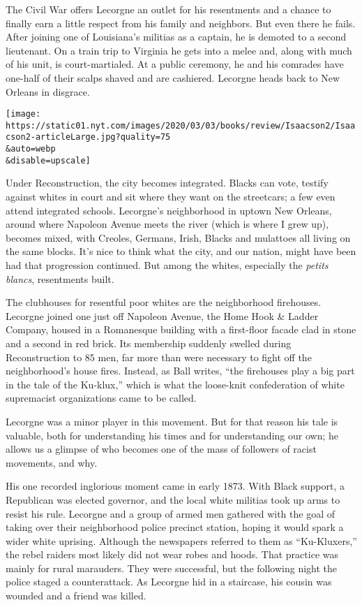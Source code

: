 The Civil War offers Lecorgne an outlet for his resentments and a chance
to finally earn a little respect from his family and neighbors. But even
there he fails. After joining one of Louisiana's militias as a captain,
he is demoted to a second lieutenant. On a train trip to Virginia he
gets into a melee and, along with much of his unit, is court-martialed.
At a public ceremony, he and his comrades have one-half of their scalps
shaved and are cashiered. Lecorgne heads back to New Orleans in
disgrace.

\texttt{[image: https://static01.nyt.com/images/2020/03/03/books/review/Isaacson2/Isaacson2-articleLarge.jpg?quality=75\\\&auto=webp\\\&disable=upscale]}

Under Reconstruction, the city becomes integrated. Blacks can vote,
testify against whites in court and sit where they want on the
streetcars; a few even attend integrated schools. Lecorgne's
neighborhood in uptown New Orleans, around where Napoleon Avenue meets
the river (which is where I grew up), becomes mixed, with Creoles,
Germans, Irish, Blacks and mulattoes all living on the same blocks. It's
nice to think what the city, and our nation, might have been had that
progression continued. But among the whites, especially the \emph{petits
blancs}, resentments built.

The clubhouses for resentful poor whites are the neighborhood
firehouses. Lecorgne joined one just off Napoleon Avenue, the Home Hook
\& Ladder Company, housed in a Romanesque building with a first-floor
facade clad in stone and a second in red brick. Its membership suddenly
swelled during Reconstruction to 85 men, far more than were necessary to
fight off the neighborhood's house fires. Instead, as Ball writes, ``the
firehouses play a big part in the tale of the Ku-klux,'' which is what
the loose-knit confederation of white supremacist organizations came to
be called.

Lecorgne was a minor player in this movement. But for that reason his
tale is valuable, both for understanding his times and for understanding
our own; he allows us a glimpse of who becomes one of the mass of
followers of racist movements, and why.

His one recorded inglorious moment came in early 1873. With Black
support, a Republican was elected governor, and the local white militias
took up arms to resist his rule. Lecorgne and a group of armed men
gathered with the goal of taking over their neighborhood police precinct
station, hoping it would spark a wider white uprising. Although the
newspapers referred to them as ``Ku-Kluxers,'' the rebel raiders most
likely did not wear robes and hoods. That practice was mainly for rural
marauders. They were successful, but the following night the police
staged a counterattack. As Lecorgne hid in a staircase, his cousin was
wounded and a friend was killed.

